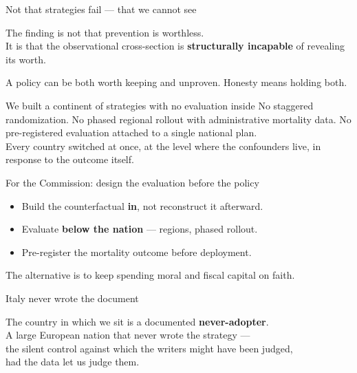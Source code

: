 \documentclass[aspectratio=169,11pt]{beamer}
\begin{document}

\begin{frame}{Not that strategies fail --- that we cannot see}
\vfill
\begin{center}
{\Large The finding is not that prevention is worthless.}\\[0.6em]
{\Large It is that the observational cross-section is \textbf{structurally incapable} of revealing its worth.}
\end{center}
\vfill
\begin{center}\color{warmgray}A policy can be both worth keeping and unproven. Honesty means holding both.\end{center}
\vfill
\end{frame}

\begin{frame}{We built a continent of strategies with no evaluation inside}
\vspace{0.8em}
No staggered randomization. No phased regional rollout with administrative mortality data. No pre-registered evaluation attached to a single national plan.\\[0.8em]
Every country switched at once, at the level where the confounders live, in response to the outcome itself.
\end{frame}

\begin{frame}{For the Commission: design the evaluation before the policy}
\begin{itemize}
\item Build the counterfactual \textbf{in}, not reconstruct it afterward.
\item Evaluate \textbf{below the nation} --- regions, phased rollout.
\item Pre-register the mortality outcome before deployment.
\end{itemize}
\vspace{0.5em}
\begin{center}\color{warmgray}The alternative is to keep spending moral and fiscal capital on faith.\end{center}
\end{frame}

\begin{frame}{Italy never wrote the document}
\vfill
\begin{center}
{\Large The country in which we sit is a documented \textbf{never-adopter}.}\\[0.6em]
{\large A large European nation that never wrote the strategy ---}\\[0.2em]
{\large the silent control against which the writers might have been judged,}\\[0.2em]
{\large had the data let us judge them.}
\end{center}
\vfill
\end{frame}

\end{document}
